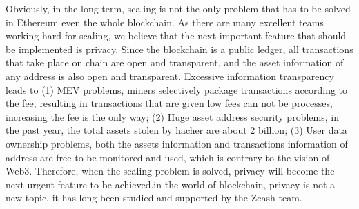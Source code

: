 Obviously, in the long term, scaling is not the only problem that has to be solved in Ethereum\cite{website:Ethereum} even the whole blockchain. As there are
many excellent teams working hard for scaling, we believe that the next important feature that should be implemented is privacy. Since the blockchain is 
a public ledger, all transactions that take place on chain are open and transparent, 
and the asset information of any address is also open and transparent. Excessive 
information transparency leads to (1) MEV problems, miners selectively package 
transactions according to the fee, resulting in transactions that are given low fees can not be 
processes, increasing the fee is the only way; (2) Huge asset address security problems, in the past 
year, the total assets stolen by hacher are about 2 billion; (3) User data 
ownership problems, both the assets information and transactions information of address are free to be monitored and used, which is contrary to 
the vision of Web3\cite{website:Web3}. Therefore, when the scaling problem is solved, privacy will become the next urgent feature to be achieved.in the world of 
blockchain, privacy is not a new topic, it has long been studied and supported by the Zcash team\cite{website:Zcash}.





